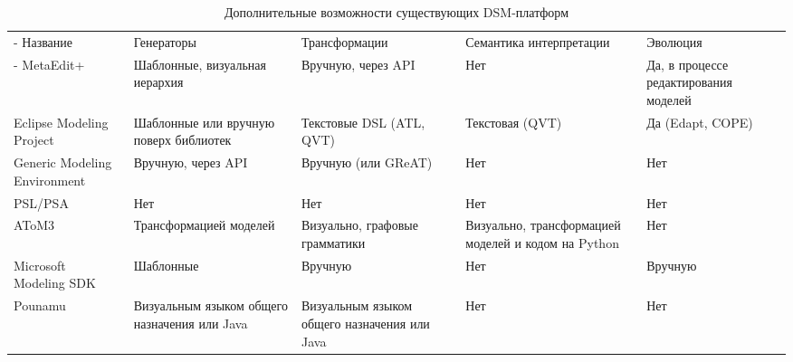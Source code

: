 \begin{table}[ht]
\begin{small}
	\begin{longtabu} {| X[1 l p] | X[1 l p] | X[1 l p] | X[1 l p] | X[1 l p] |}
		\caption{Дополнительные возможности существующих DSM-платформ} \\
		\tabucline-
		 Название                    & Генераторы                                    & Трансформации                                  & Семантика интерпретации                             & Эволюция                                                                   \\
		\tabucline-
		\everyrow{\tabucline-}
		MetaEdit+                    & Шаблонные, визуальная иерархия                & Вручную, через API                             & Нет                                                 & Да, в процессе редактирования моделей                                      \\
		Eclipse Modeling Project     & Шаблонные или вручную поверх библиотек        & Текстовые DSL (ATL, QVT)                       & Текстовая (QVT)                                     & Да (Edapt, COPE)                                                           \\
		Generic Modeling Environment & Вручную, через API                            & Вручную (или GReAT)                            & Нет                                                 & Нет                                                                        \\
		PSL/PSA                      & Нет                                           & Нет                                            & Нет                                                 & Нет                                                                        \\
		AToM3                        & Трансформацией моделей                        & Визуально, графовые грамматики                 & Визуально, трансформацией моделей и кодом на Python & Нет                                                                        \\
		Microsoft Modeling SDK       & Шаблонные                                     & Вручную                                        & Нет                                                 & Вручную                                                                    \\
		Pounamu                      & Визуальным языком общего назначения или Java  & Визуальным языком общего назначения или Java   & Нет                                                 & Нет                                                                        \\

\end{longtabu}
\end{small}
\end{table}
